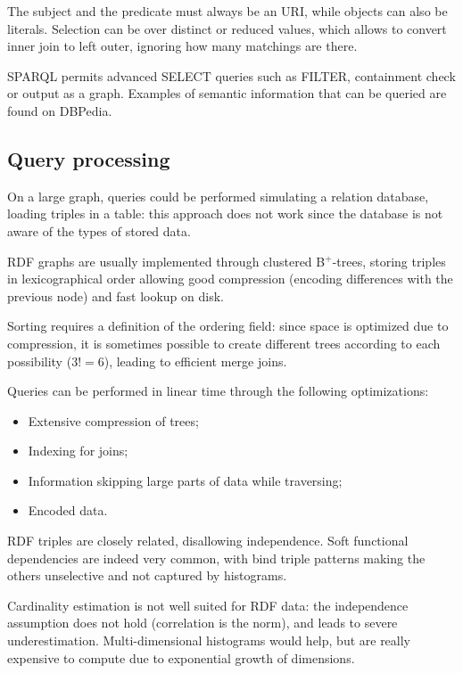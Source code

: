 The subject and the predicate must always be an URI, while objects can also be literals. Selection can be over distinct or reduced values, which allows to convert inner join to left outer, ignoring how many matchings are there.

SPARQL permits advanced SELECT queries such as FILTER, containment check or output as a graph. Examples of semantic information that can be queried are found on DBPedia.

\subsection{Query processing}
On a large graph, queries could be performed simulating a relation database, loading triples in a table: this approach does not work since the database is not aware of the types of stored data. 

RDF graphs are usually implemented through clustered B$^+$-trees, storing triples in lexicographical order allowing good compression (encoding differences with the previous node) and fast lookup on disk.

Sorting requires a definition of the ordering field: since space is optimized due to compression, it is sometimes possible to create different trees according to each possibility ($3! = 6$), leading to efficient merge joins. 

Queries can be performed in linear time through the following optimizations:
\begin{itemize}
	\item Extensive compression of trees;
	\item Indexing for joins;
	\item Information skipping large parts of data while traversing;
	\item Encoded data.
\end{itemize}


RDF triples are closely related, disallowing independence. Soft functional dependencies are indeed very common, with bind triple patterns making the others unselective and not captured by histograms.

Cardinality estimation is not well suited for RDF data: the independence assumption does not hold (correlation is the norm), and leads to severe underestimation. Multi-dimensional histograms would help, but are really expensive to compute due to exponential growth of dimensions.

